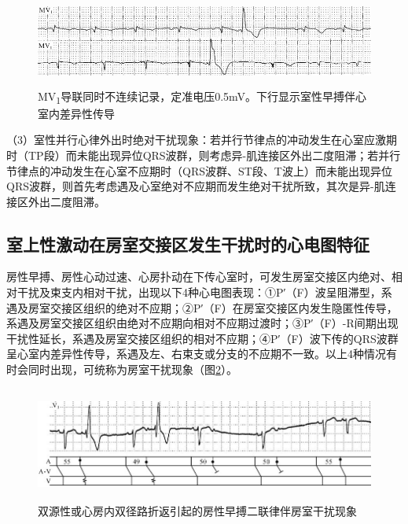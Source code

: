 \begin{figure}[!htbp]
 \centering
 \includegraphics[width=5.58333in,height=1.16667in]{./images/Image00449.jpg}
 \captionsetup{justification=centering}
 \caption{MV\textsubscript{1}导联同时不连续记录，定准电压0.5mV。下行显示室性早搏伴心室内差异性传导}
 \label{fig26-8}
  \end{figure} 


（3）室性并行心律外出时绝对干扰现象：若并行节律点的冲动发生在心室应激期时（TP段）而未能出现异位QRS波群，则考虑异-肌连接区外出二度阻滞；若并行节律点的冲动发生在心室不应期时（QRS波群、ST段、T波上）而未能出现异位QRS波群，则首先考虑遇及心室绝对不应期而发生绝对干扰所致，其次是异-肌连接区外出二度阻滞。

\protect\hypertarget{text00033.htmlux5cux23subid399}{}{}

\subsection{室上性激动在房室交接区发生干扰时的心电图特征}

房性早搏、房性心动过速、心房扑动在下传心室时，可发生房室交接区内绝对、相对干扰及束支内相对干扰，出现以下4种心电图表现：①P′（F）波呈阻滞型，系遇及房室交接区组织的绝对不应期；②P′（F）在房室交接区内发生隐匿性传导，系遇及房室交接区组织由绝对不应期向相对不应期过渡时；③P′（F）-R间期出现干扰性延长，系遇及房室交接区组织的相对不应期；④P′（F）波下传的QRS波群呈心室内差异性传导，系遇及左、右束支或分支的不应期不一致。以上4种情况有时会同时出现，可统称为房室干扰现象（图\ref{fig26-9}）。

\begin{figure}[!htbp]
 \centering
 \includegraphics[width=5.79167in,height=1.47917in]{./images/Image00450.jpg}
 \captionsetup{justification=centering}
 \caption{双源性或心房内双径路折返引起的房性早搏二联律伴房室干扰现象}
 \label{fig26-9}
  \end{figure} 

